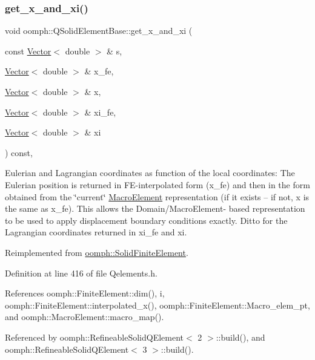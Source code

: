 \subsubsection{\texorpdfstring{get\+\_\+x\+\_\+and\+\_\+xi()}{get\_x\_and\_xi()}}
{\footnotesize\ttfamily void oomph\+::\+Q\+Solid\+Element\+Base\+::get\+\_\+x\+\_\+and\+\_\+xi (\begin{DoxyParamCaption}\item[{const \hyperlink{classoomph_1_1Vector}{Vector}$<$ double $>$ \&}]{s,  }\item[{\hyperlink{classoomph_1_1Vector}{Vector}$<$ double $>$ \&}]{x\+\_\+fe,  }\item[{\hyperlink{classoomph_1_1Vector}{Vector}$<$ double $>$ \&}]{x,  }\item[{\hyperlink{classoomph_1_1Vector}{Vector}$<$ double $>$ \&}]{xi\+\_\+fe,  }\item[{\hyperlink{classoomph_1_1Vector}{Vector}$<$ double $>$ \&}]{xi }\end{DoxyParamCaption}) const\hspace{0.3cm}{\ttfamily [inline]}, {\ttfamily [virtual]}}



Eulerian and Lagrangian coordinates as function of the local coordinates\+: The Eulerian position is returned in F\+E-\/interpolated form ({\ttfamily x\+\_\+fe}) and then in the form obtained from the \char`\"{}current\char`\"{} \hyperlink{classoomph_1_1MacroElement}{Macro\+Element} representation (if it exists -- if not, {\ttfamily x} is the same as {\ttfamily x\+\_\+fe}). This allows the Domain/\+Macro\+Element-\/ based representation to be used to apply displacement boundary conditions exactly. Ditto for the Lagrangian coordinates returned in xi\+\_\+fe and xi. 



Reimplemented from \hyperlink{classoomph_1_1SolidFiniteElement_a2e557cb3647e40fe3225bab4d8f834a0}{oomph\+::\+Solid\+Finite\+Element}.



Definition at line 416 of file Qelements.\+h.



References oomph\+::\+Finite\+Element\+::dim(), i, oomph\+::\+Finite\+Element\+::interpolated\+\_\+x(), oomph\+::\+Finite\+Element\+::\+Macro\+\_\+elem\+\_\+pt, and oomph\+::\+Macro\+Element\+::macro\+\_\+map().



Referenced by oomph\+::\+Refineable\+Solid\+Q\+Element$<$ 2 $>$\+::build(), and oomph\+::\+Refineable\+Solid\+Q\+Element$<$ 3 $>$\+::build().

